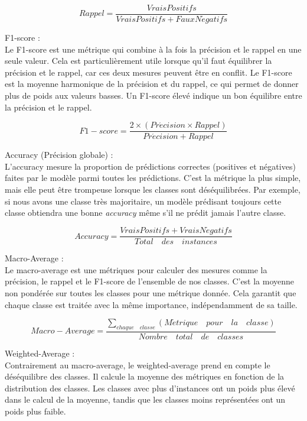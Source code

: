 \begin{equation}
Rappel = \frac{Vrais Positifs}{Vrais Positifs + Faux N\acute{e}gatifs}
\end{equation}

F1-score :\\
Le F1-score est une métrique qui combine à la fois la précision et le rappel en une seule valeur. Cela est particulièrement utile lorsque qu'il faut équilibrer la précision et le rappel, car ces deux mesures peuvent être en conflit. Le F1-score est la moyenne harmonique de la précision et du rappel, ce qui permet de donner plus de poids aux valeurs basses. Un F1-score élevé indique un bon équilibre entre la précision et le rappel.

\begin{equation}
F1-score = \frac{2 \times (Pr\acute{e}cision \times Rappel)}{Pr\acute{e}cision + Rappel}
\end{equation}

Accuracy (Précision globale) :\\
L'accuracy mesure la proportion de prédictions correctes (positives et négatives) faites par le modèle parmi toutes les prédictions. C'est la métrique la plus simple, mais elle peut être trompeuse lorsque les classes sont déséquilibrées. Par exemple, si nous avons une classe très majoritaire, un modèle prédisant toujours cette classe obtiendra une bonne \textit{accuracy} même s'il ne prédit jamais l'autre classe.

\begin{equation}
Accuracy = \frac{Vrais Positifs + Vrais N\acute{e}gatifs}{Total\quad des\quad instances}
\end{equation}

Macro-Average :\\
Le macro-average est une métriques pour calculer des mesures comme la précision, le rappel et le F1-score de l'ensemble de nos classes. C'est la moyenne non pondérée sur toutes les classes pour une métrique donnée. Cela garantit que chaque classe est traitée avec la même importance, indépendamment de sa taille.

\begin{equation}
Macro-Average = \frac{\sum_{chaque\quad classe} (M\acute{e}trique\quad pour\quad la\quad classe)}{Nombre\quad total\quad de\quad classes}
\end{equation}


Weighted-Average :\\
 Contrairement au macro-average, le weighted-average prend en compte le déséquilibre des classes. Il calcule la moyenne des métriques en fonction de la distribution des classes. Les classes avec plus d'instances ont un poids plus élevé dans le calcul de la moyenne, tandis que les classes moins représentées ont un poids plus faible.

